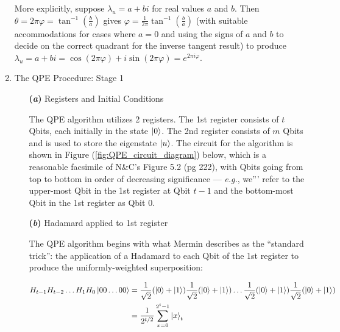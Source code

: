 \documentclass{article}
\begin{document}
\begin{enumerate}[label=\textbf{(\arabic*)}]
More explicitly, suppose $\lambda_{u} = a + bi$ for real values $a$ and $b$. Then $\theta = 2\pi\varphi = \tan^{-1}(\frac{b}{a})$ gives $\varphi = \frac{1}{2\pi}\tan^{-1}(\frac{b}{a})$ (with suitable accommodations for cases where $a=0$ and using the signs of $a$ and $b$ to decide on the correct quadrant for the inverse tangent result) to produce $\lambda_{u} = a + bi = \cos(2\pi\varphi) + i\sin(2\pi\varphi) = e^{2\pi i \varphi}$.

\item The QPE Procedure: Stage 1

\begin{itemize}
  \item[\textbf{(\textit{a})}] Registers and Initial Conditions
  
  \vspace{0.05in}
  
  The QPE algorithm utilizes 2 registers. The 1st register consists of $t$ Qbits, each initially in the state $\ket{0}$. The 2nd register consists of $m$ Qbits and is used to store the eigenstate $\ket{u}$. The circuit for the algorithm is shown in Figure (\ref{fig:QPE_circuit_diagram}) below, which is a reasonable facsimile of N\&C's Figure 5.2 (pg 222), with Qbits going from top to bottom in order of decreasing significance --- \textit{e.g.}, we''' refer to the upper-most Qbit in the 1st register at Qbit $t-1$ and the bottom-most Qbit in the 1st register as Qbit $0$.
  
  \vspace{0.05in}
  
  \item[\textbf{(\textit{b})}] Hadamard applied to 1st register
  
  \vspace{0.05in}
  
  The QPE algorithm begins with what Mermin describes as the ``standard trick'': the application of a Hadamard to each Qbit of the 1st register to produce the uniformly-weighted superposition:
  
  \begin{align}
      H_{t-1}H_{t-2}\ldots H_{1}H_{0}\ket{00\ldots 00}
      &=
      \frac{1}{\sqrt{2}}(\ket{0} + \ket{1})
      \frac{1}{\sqrt{2}}(\ket{0} + \ket{1})
      \ldots
      \frac{1}{\sqrt{2}}(\ket{0} + \ket{1})
      \frac{1}{\sqrt{2}}(\ket{0} + \ket{1})\\
      &=
      \frac{1}{2^{t/2}}\sum_{x=0}^{2^t-1}\ket{x}_{t}
  \end{align}
  

\end{itemize}
\end{enumerate}
\end{document}
